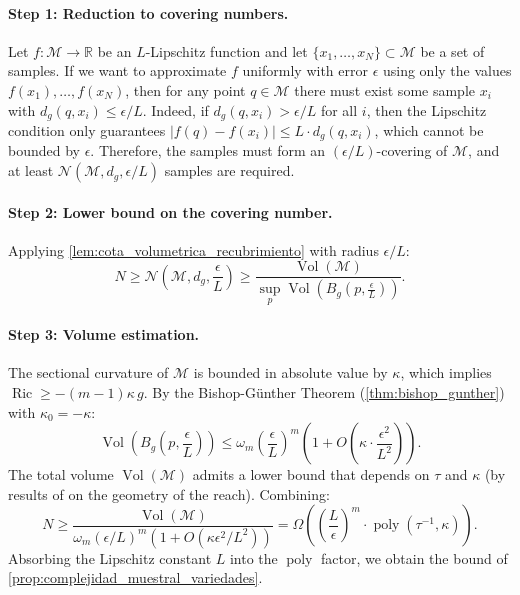 \paragraph{Step 1: Reduction to covering numbers.}
Let $f: \mathcal{M} \to \mathbb{R}$ be an $L$-Lipschitz function and let $\{x_1, \ldots, x_N\} \subset \mathcal{M}$ be a set of samples. If we want to approximate $f$ uniformly with error $\epsilon$ using only the values $f(x_1), \ldots, f(x_N)$, then for any point $q \in \mathcal{M}$ there must exist some sample $x_i$ with $d_g(q, x_i) \leq \epsilon/L$. Indeed, if $d_g(q, x_i) > \epsilon/L$ for all $i$, then the Lipschitz condition only guarantees $|f(q) - f(x_i)| \leq L \cdot d_g(q, x_i)$, which cannot be bounded by $\epsilon$. Therefore, the samples must form an $(\epsilon/L)$-covering of $\mathcal{M}$, and at least $\mathcal{N}(\mathcal{M}, d_g, \epsilon/L)$ samples are required.

\paragraph{Step 2: Lower bound on the covering number.}
Applying \autoref{lem:cota_volumetrica_recubrimiento} with radius $\epsilon/L$:
\[
N \geq \mathcal{N}\!\left(\mathcal{M}, d_g, \frac{\epsilon}{L}\right) \geq \frac{\operatorname{Vol}(\mathcal{M})}{\sup_{p} \operatorname{Vol}\!\left(B_g\!\left(p, \frac{\epsilon}{L}\right)\right)}.
\]

\paragraph{Step 3: Volume estimation.}
The sectional curvature of $\mathcal{M}$ is bounded in absolute value by $\kappa$, which implies $\operatorname{Ric} \geq -(m-1)\kappa \, g$. By the Bishop-Günther Theorem (\autoref{thm:bishop_gunther}) with $\kappa_0 = -\kappa$:
\[
\operatorname{Vol}\!\left(B_g\!\left(p, \frac{\epsilon}{L}\right)\right) \leq \omega_m \left(\frac{\epsilon}{L}\right)^m \left(1 + O\!\left(\kappa \cdot \frac{\epsilon^2}{L^2}\right)\right).
\]
The total volume $\operatorname{Vol}(\mathcal{M})$ admits a lower bound that depends on $\tau$ and $\kappa$ (by results of \citet{niyogi2008finding} on the geometry of the reach). Combining:
\[
N \geq \frac{\operatorname{Vol}(\mathcal{M})}{\omega_m (\epsilon/L)^m (1 + O(\kappa \epsilon^2/L^2))} = \Omega\!\left(\left(\frac{L}{\epsilon}\right)^m \cdot \operatorname{poly}(\tau^{-1}, \kappa)\right).
\]
Absorbing the Lipschitz constant $L$ into the $\operatorname{poly}$ factor, we obtain the bound of \autoref{prop:complejidad_muestral_variedades}.


